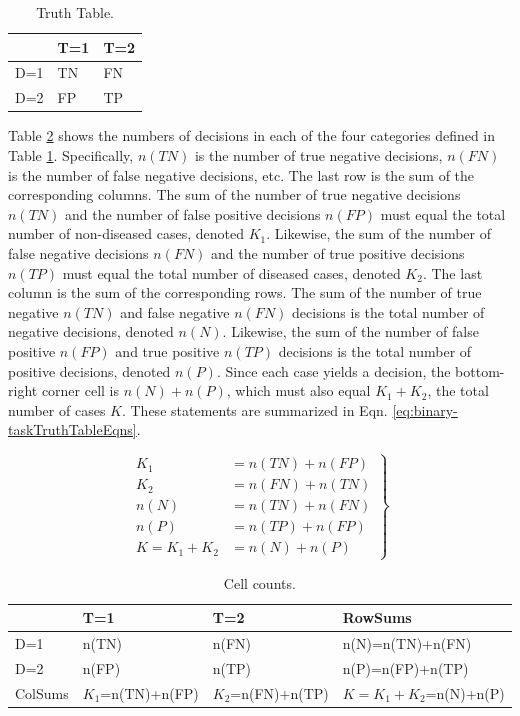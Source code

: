 \documentclass[
]{book}
\begin{document}
\begin{table}

\caption{\label{tab:binary-tasktruthTable}Truth Table.}
\centering
\begin{tabular}[t]{l|l|l}
\hline
  & T=1 & T=2\\
\hline
D=1 & TN & FN\\
\hline
D=2 & FP & TP\\
\hline
\end{tabular}
\end{table}

Table \ref{tab:binary-tasktruthTable2} shows the numbers of decisions in each of the four categories defined in Table \ref{tab:binary-tasktruthTable}. Specifically, \(n(TN)\) is the number of true negative decisions, \(n(FN)\) is the number of false negative decisions, etc. The last row is the sum of the corresponding columns. The sum of the number of true negative decisions \(n(TN)\) and the number of false positive decisions \(n(FP)\) must equal the total number of non-diseased cases, denoted \(K_1\). Likewise, the sum of the number of false negative decisions \(n(FN)\) and the number of true positive decisions \(n(TP)\) must equal the total number of diseased cases, denoted \(K_2\). The last column is the sum of the corresponding rows. The sum of the number of true negative \(n(TN)\) and false negative \(n(FN)\) decisions is the total number of negative decisions, denoted \(n(N)\). Likewise, the sum of the number of false positive \(n(FP)\) and true positive \(n(TP)\) decisions is the total number of positive decisions, denoted \(n(P)\). Since each case yields a decision, the bottom-right corner cell is \(n(N) + n(P)\), which must also equal \(K_1+K_2\), the total number of cases \(K\). These statements are summarized in Eqn. \eqref{eq:binary-taskTruthTableEqns}.

\begin{equation} 
\left.\begin{aligned}
K_1&=n(TN)+n(FP)\\ 
K_2&=n(FN)+n(TN)\\ 
n(N)&=n(TN)+n(FN)\\ 
n(P)&=n(TP)+n(FP)\\
K=K_1+K_2&=n(N)+n(P)
\end{aligned}\right\}
\label{eq:binary-taskTruthTableEqns}
\end{equation}

\begin{table}

\caption{\label{tab:binary-tasktruthTable2}Cell counts.}
\centering
\begin{tabular}[t]{l|l|l|l}
\hline
  & T=1 & T=2 & RowSums\\
\hline
D=1 & n(TN) & n(FN) & n(N)=n(TN)+n(FN)\\
\hline
D=2 & n(FP) & n(TP) & n(P)=n(FP)+n(TP)\\
\hline
ColSums & $K_1$=n(TN)+n(FP) & $K_2$=n(FN)+n(TP) & $K=K_1+K_2$=n(N)+n(P)\\
\hline
\end{tabular}
\end{table}
\end{document}
